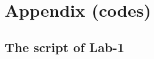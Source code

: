 \documentclass[12pt]{article}
\begin{document}



\pagebreak

\begin{enumerate}





























\end{enumerate}



\newpage



\newpage
\section{Appendix (codes)}
\subsection{The script of Lab-1}
\end{document}
